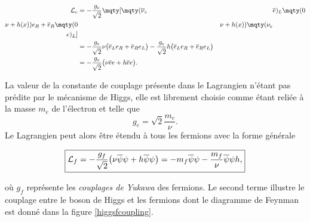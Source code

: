         \begin{align*}
             \mathcal{L}_e & = -\frac{g_e}{\sqrt{2}}\mqty[\mqty(\overline{\nu}_e&&\overline{e})_L\mqty(0\\\nu+h(x))e_R+\overline{e}_R\mqty(0&&\nu+h(x))\mqty(\nu_e\\e)_L] \vspace{5pt} \\
             & = -\frac{g_e}{\sqrt{2}}\nu\bigl(\overline{e}_Le_R+\overline{e}_Re_L\bigr)-\frac{g_e}{\sqrt{2}}h\bigl(\overline{e}_Le_R+\overline{e}_Re_L\bigr) \vspace{5pt} \\
             & = -\frac{g_e}{\sqrt{2}}\bigl(\nu\overline{e}e+h\overline{e}e\bigr).
        \end{align*}

        La valeur de la constante de couplage présente dans le Lagrangien n'étant pas prédite par le mécanisme de Higgs, elle est librement choisie comme étant reliée à la masse $m_e$ de l'électron et telle que $$g_e=\sqrt{2}\frac{m_e}{\nu}.$$ Le Lagrangien peut alors être étendu à tous les fermions avec la forme générale

        \begin{equation}
        \boxed{
            \mathcal{L}_f=-\frac{g_f}{\sqrt{2}}\bigl(\nu\overline{\psi}\psi+h\overline{\psi}\psi\bigr) \vspace{5pt}=-m_f\overline{\psi}\psi-\frac{m_f}{\nu}\overline{\psi}\psi h
        ,}
        \label{yukawacoupling}
        \end{equation}

        où $g_f$ représente les \textit{couplages de Yukawa} des fermions. Le second terme illustre le couplage entre le boson de Higgs et les fermions dont le diagramme de Feynman est donné dans la figure \ref{higgsfcoupling}.



        
